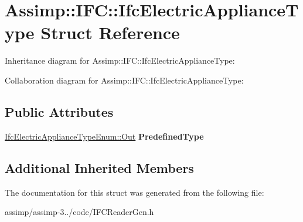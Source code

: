 \hypertarget{struct_assimp_1_1_i_f_c_1_1_ifc_electric_appliance_type}{\section{Assimp\+:\+:I\+F\+C\+:\+:Ifc\+Electric\+Appliance\+Type Struct Reference}
\label{struct_assimp_1_1_i_f_c_1_1_ifc_electric_appliance_type}
}


Inheritance diagram for Assimp\+:\+:I\+F\+C\+:\+:Ifc\+Electric\+Appliance\+Type\+:


Collaboration diagram for Assimp\+:\+:I\+F\+C\+:\+:Ifc\+Electric\+Appliance\+Type\+:
\subsection*{Public Attributes}
\begin{DoxyCompactItemize}
\item 
\hypertarget{struct_assimp_1_1_i_f_c_1_1_ifc_electric_appliance_type_a3670f1ad94fff1920ded01b00a75ea08}{\hyperlink{classboost_1_1shared__ptr}{Ifc\+Electric\+Appliance\+Type\+Enum\+::\+Out} {\bfseries Predefined\+Type}}\label{struct_assimp_1_1_i_f_c_1_1_ifc_electric_appliance_type_a3670f1ad94fff1920ded01b00a75ea08}

\end{DoxyCompactItemize}
\subsection*{Additional Inherited Members}


The documentation for this struct was generated from the following file\+:\begin{DoxyCompactItemize}
\item 
assimp/assimp-\/3../code/I\+F\+C\+Reader\+Gen.\+h\end{DoxyCompactItemize}
